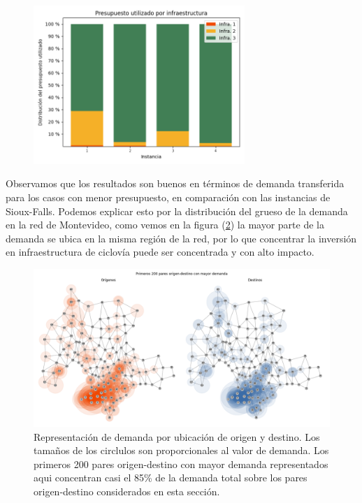 \documentclass{article}
\begin{document}
  \begin{figure}[h!]
    \centering
    \includegraphics[width=8cm]{../resources/montevideo_budget_usage_by_infra.png}
      \caption{}
    \label{fig:montevideobudgetusage}
  \end{figure}

  Observamos que los resultados son buenos en términos de demanda transferida para los casos con menor presupuesto, en comparación con las instancias de Sioux-Falls. Podemos explicar esto por la distribución del grueso de la demanda en la red de Montevideo, como vemos en la figura (\ref{fig:montevideodemanddist}) la mayor parte de la demanda se ubica en la misma región de la red, por lo que concentrar la inversión en infraestructura de ciclovía puede ser concentrada y con alto impacto.

  \begin{figure}[h!]
    \centering
    \includegraphics[width=12cm]{../resources/montevideo_demands.png}
      \caption{Representación de demanda por ubicación de origen y destino. Los tamaños de los circlulos son proporcionales al valor de demanda. Los primeros 200 pares origen-destino con mayor demanda representados aqui concentran casi el 85\% de la demanda total sobre los pares origen-destino considerados en esta sección.}
    \label{fig:montevideodemanddist}
  \end{figure}
\end{document}
